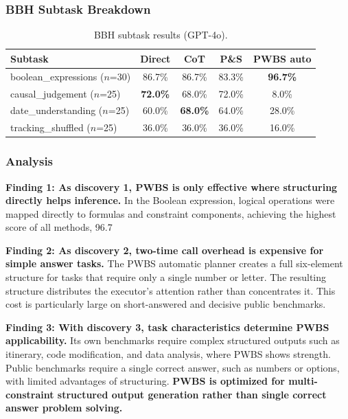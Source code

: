 \documentclass[11pt,a4paper]{article}
\begin{document}
\subsubsection{BBH Subtask Breakdown}

\begin{table}[ht]
\centering
\caption{BBH subtask results (GPT-4o).}
\label{tab:bbh-subtask}
\begin{tabular}{lcccc}
\toprule
\textbf{Subtask} & \textbf{Direct} & \textbf{CoT} & \textbf{P\&S} & \textbf{PWBS auto} \\
\midrule
boolean\_expressions ($n$=30) & 86.7\% & 86.7\% & 83.3\% & \textbf{96.7\%} \\
causal\_judgement ($n$=25) & \textbf{72.0\%} & 68.0\% & 72.0\% & 8.0\% \\
date\_understanding ($n$=25) & 60.0\% & \textbf{68.0\%} & 64.0\% & 28.0\% \\
tracking\_shuffled ($n$=25) & 36.0\% & 36.0\% & 36.0\% & 16.0\% \\
\bottomrule
\end{tabular}
\end{table}

\subsubsection{Analysis}

\textbf{Finding 1: As discovery 1, PWBS is only effective where structuring directly helps inference.} In the Boolean expression, logical operations were mapped directly to formulas and constraint components, achieving the highest score of all methods, 96.7%

\textbf{Finding 2: As discovery 2, two-time call overhead is expensive for simple answer tasks.} The PWBS automatic planner creates a full six-element structure for tasks that require only a single number or letter. The resulting structure distributes the executor's attention rather than concentrates it. This cost is particularly large on short-answered and decisive public benchmarks.

\textbf{Finding 3: With discovery 3, task characteristics determine PWBS applicability.} Its own benchmarks require complex structured outputs such as itinerary, code modification, and data analysis, where PWBS shows strength. Public benchmarks require a single correct answer, such as numbers or options, with limited advantages of structuring. \textbf{PWBS is optimized for multi-constraint structured output generation rather than single correct answer problem solving.}
\end{document}
